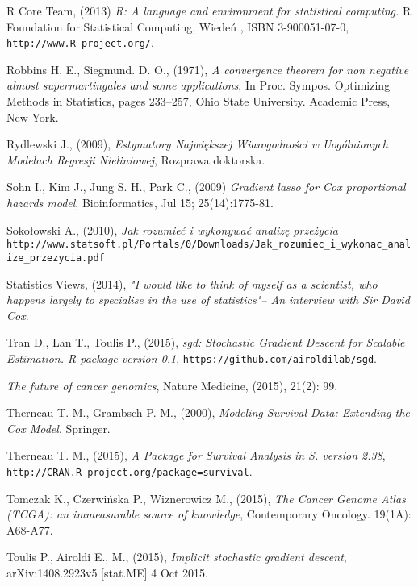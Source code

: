 \begin{thebibliography}{99}
 R Core Team, (2013) \textit{R: A language and environment for statistical computing.} R Foundation for Statistical Computing, Wiedeń , ISBN 3-900051-07-0, \\ \texttt{http://www.R-project.org/}.


 Robbins H. E., Siegmund. D. O., (1971), \textit{A convergence theorem for non negative almost supermartingales and some applications}, In Proc. Sympos. Optimizing Methods in Statistics, pages 233–257, Ohio State
University. Academic Press, New York.

 Rydlewski J., (2009), \textit{Estymatory Największej Wiarogodności w Uogólnionych Modelach Regresji Nieliniowej}, Rozprawa doktorska.

 Sohn I., Kim J., Jung S. H., Park C., (2009) \textit{Gradient lasso for Cox proportional hazards model}, Bioinformatics, Jul 15; 25(14):1775-81.


 Sokołowski A., (2010), \textit{Jak rozumieć i wykonywać analizę przeżycia} \\ \texttt{http://www.statsoft.pl/Portals/0/Downloads/Jak\_rozumiec\_i\_wykonac\_analize\_przezycia.pdf}

 Statistics Views, (2014), \textit{ "I would like to think of myself as a scientist, who happens largely to specialise in the use of statistics"– An interview with Sir David Cox}.

 Tran D., Lan T., Toulis P., (2015), \textit{sgd: Stochastic Gradient Descent for Scalable Estimation. R package version 0.1}, \texttt{https://github.com/airoldilab/sgd}.


 \textit{The future of cancer genomics}, Nature Medicine, (2015), 21(2): 99.

 Therneau T. M., Grambsch P. M., (2000), \textit{Modeling Survival Data: Extending the Cox Model}, Springer.

 Therneau T. M., (2015), \textit{A Package for Survival Analysis in S. version 2.38}, \\ \texttt{http://CRAN.R-project.org/package=survival}.


 Tomczak K., Czerwińska P., Wiznerowicz M., (2015), \textit{The Cancer Genome Atlas (TCGA): an immeasurable source of knowledge}, Contemporary Oncology. 19(1A): A68-A77.


 Toulis P.,Airoldi E., M., (2015), \textit{Implicit stochastic gradient descent}, arXiv:1408.2923v5 [stat.ME] 4 Oct 2015.


\end{thebibliography}

